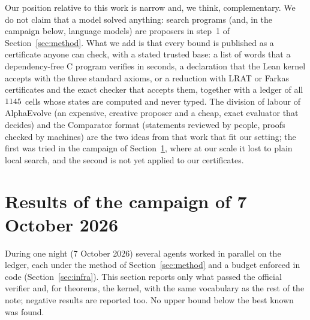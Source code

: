 \documentclass[11pt]{amsart}
\theoremstyle{definition}
\theoremstyle{remark}
\begin{document}
Our position relative to this work is narrow and, we think, complementary.
We do not claim that a model solved anything: search programs (and, in the campaign below, language models) are proposers in step~1 of Section~\ref{sec:method}.
What we add is that every bound is published as a certificate anyone can check, with a stated trusted base: a list of words that a dependency-free C program verifies in seconds, a declaration that the Lean kernel accepts with the three standard axioms, or a reduction with LRAT or Farkas certificates and the exact checker that accepts them, together with a ledger of all $1145$ cells whose states are computed and never typed.
The division of labour of AlphaEvolve (an expensive, creative proposer and a cheap, exact evaluator that decides) and the Comparator format (statements reviewed by people, proofs checked by machines) are the two ideas from that work that fit our setting; the first was tried in the campaign of Section~\ref{sec:campanha}, where at our scale it lost to plain local search, and the second is not yet applied to our certificates.

\section{Results of the campaign of 7 October 2026}\label{sec:campanha}
During one night (7 October 2026) several agents worked in parallel on the ledger, each under the method of Section~\ref{sec:method} and a budget enforced in code (Section~\ref{sec:infra}).
This section reports only what passed the official verifier and, for theorems, the kernel, with the same vocabulary as the rest of the note; negative results are reported too.
No upper bound below the best known was found.
\end{document}
